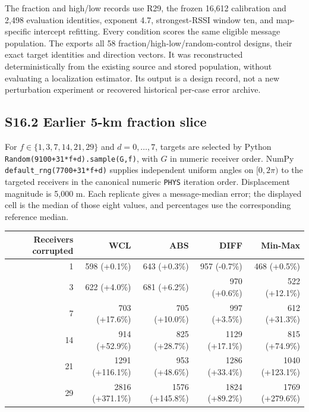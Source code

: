 \documentclass[journal,onecolumn,10pt]{IEEEtran}
\begin{document}
The fraction and high/low records use R29, the frozen 16,612 calibration and 2,498 evaluation identities, exponent 4.7, strongest-RSSI window ten, and map-specific intercept refitting. Every condition scores the same eligible message population. The  exports all 58 fraction/high-low/random-control designs, their exact target identities and direction vectors. It was reconstructed deterministically from the existing source and stored population, without evaluating a localization estimator. Its output is a design record, not a new perturbation experiment or recovered historical per-case error archive.

\subsection*{S16.2 Earlier 5-km fraction slice}
For $f\in\{1,3,7,14,21,29\}$ and $d=0,\ldots,7$, targets are selected by Python \texttt{Random(9100+31*f+d).sample(G,f)}, with $G$ in numeric receiver order. NumPy \texttt{default\_rng(7700+31*f+d)} supplies independent uniform angles on $[0,2\pi)$ to the targeted receivers in the canonical numeric \texttt{PHYS} iteration order. Displacement magnitude is 5,000 m. Each replicate gives a message-median error; the displayed cell is the median of those eight values, and percentages use the corresponding reference median.

\begin{center}\begin{minipage}{\textwidth}\centering
{}\label{tab:s-historical-5km}
\begin{tabular}{@{}rrrrr@{}}
\toprule
Receivers corrupted & WCL & ABS & DIFF & Min-Max \\
\midrule
1 & 598 (+0.1\%) & 643 (+0.3\%) & 957 (-0.7\%) & 468 (+0.5\%) \\
3 & 622 (+4.0\%) & 681 (+6.2\%) & 970 (+0.6\%) & 522 (+12.1\%) \\
7 & 703 (+17.6\%) & 705 (+10.0\%) & 997 (+3.5\%) & 612 (+31.3\%) \\
14 & 914 (+52.9\%) & 825 (+28.7\%) & 1129 (+17.1\%) & 815 (+74.9\%) \\
21 & 1291 (+116.1\%) & 953 (+48.6\%) & 1286 (+33.4\%) & 1040 (+123.1\%) \\
29 & 2816 (+371.1\%) & 1576 (+145.8\%) & 1824 (+89.2\%) & 1769 (+279.6\%) \\
\bottomrule
\end{tabular}
\end{minipage}\end{center}
\end{document}

